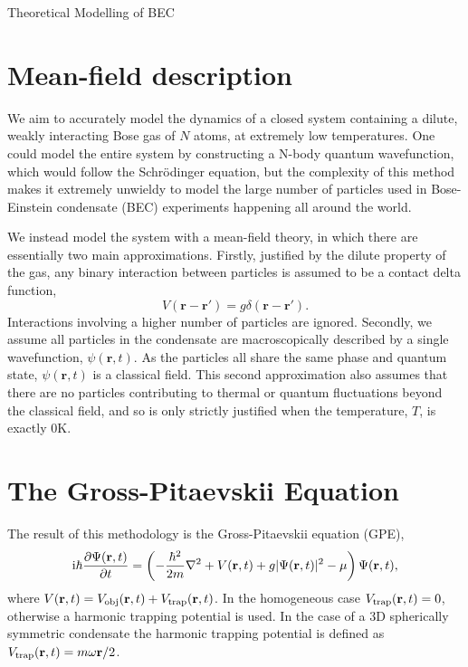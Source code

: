 \begin{chapter}{\label{cha:theoretical_model}Theoretical Modelling of BEC}
\section{\label{section:meanfield} Mean-field description}
We aim to accurately model the dynamics of a closed system containing a dilute, weakly interacting Bose gas of $N$ atoms, at extremely low temperatures. One could model the entire system by constructing a N-body quantum wavefunction, which would follow the Schr\"odinger equation, but the complexity of this method makes it extremely unwieldy to model the large number of particles used in Bose-Einstein condensate (BEC) experiments happening all around the world.

We instead model the system with a mean-field theory, in which there are essentially two main approximations. Firstly, justified by the dilute property of the gas, any binary interaction between particles is assumed to be a contact delta function,
\begin{equation*}
V(\mathbf{r}-\mathbf{r}') = g \delta(\mathbf{r}-\mathbf{r}').
\end{equation*}
Interactions involving a higher number of particles are ignored. Secondly, we assume all particles in the condensate are macroscopically described by a single wavefunction, $\psi(\mathbf{r},t)$. As the particles all share the same phase and quantum state, $\psi(\mathbf{r},t)$ is a classical field. This second approximation also assumes that there are no particles contributing to thermal or quantum fluctuations beyond the classical field, and so is only strictly justified when the temperature, $T$, is exactly $0\mathrm{K}$.

\section{\label{section:gpe} The Gross-Pitaevskii Equation}
The result of this methodology is the Gross-Pitaevskii equation (GPE), 
\begin{equation}
\mathrm{i} \hbar \frac{\partial\Psi({\bf r},t)}{\partial t} = \left(-\frac{\hbar^2}{2m}\nabla^2 + V({\bf r},t) + g|\Psi({\bf r},t)|^2 - \mu \right) \Psi({\bf r},t),
\label{eq:gpe}
\end{equation}
where $V({\bf r},t) = V_{\mathrm{obj}}({\bf r},t) + V_{\mathrm{trap}}({\bf r},t)$. In the homogeneous case $V_{\mathrm{trap}}({\bf r},t)=0$, otherwise a harmonic trapping potential is used. In the case of a 3D spherically symmetric condensate the harmonic trapping potential is defined as $V_{\mathrm{trap}}({\bf r},t)=m\omega{\bf r}/2$.


\end{chapter}
